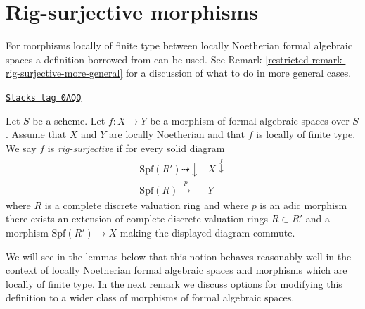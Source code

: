 \section{Rig-surjective morphisms}
\label{restricted-section-rig-surjective}
For morphisms locally of finite type between locally Noetherian formal
algebraic spaces a definition borrowed from \cite{ArtinII} can be used. See
Remark \ref{restricted-remark-rig-surjective-more-general} for a discussion
of what to do in more general cases.

\begin{definition}
\label{restricted-definition-rig-surjective}
\href{https://stacks.math.columbia.edu/tag/0AQQ}{\texttt{Stacks tag 0AQQ}}

Let $S$ be a scheme. Let $f : X \to Y$ be a morphism of formal
algebraic spaces over $S$. Assume that $X$ and $Y$ are locally
Noetherian and that $f$ is locally of finite type. We say
$f$ is {\it rig-surjective} if for every solid diagram
$$
\begin{array}{cc}\text{Spf}(R') \dashrightarrow\downarrow & X \overset{f}{\downarrow} \\ \text{Spf}(R) \overset{p}{\longrightarrow} & Y\end{array}
$$
where $R$ is a complete discrete valuation ring and where
$p$ is an adic morphism there exists an
extension of complete discrete valuation rings $R \subset R'$
and a morphism $\text{Spf}(R') \to X$ making the displayed diagram commute.
\end{definition}

We will see in the lemmas below that this notion behaves reasonably well
in the context of locally Noetherian formal algebraic spaces and morphisms
which are locally of finite type.
In the next remark we discuss options for modifying this definition
to a wider class of morphisms of formal algebraic spaces.

